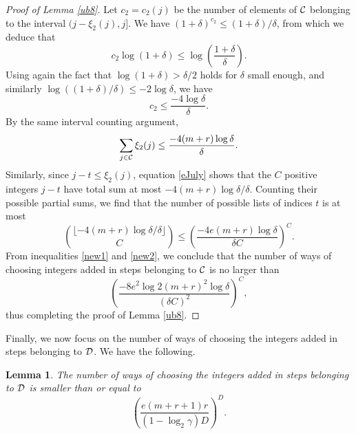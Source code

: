 \documentclass{article}
\newtheorem{lemma}[theorem]{Lemma}
\theoremstyle{definition}
\begin{document}
\begin{proof}[Proof of Lemma \ref{ub8}]
Let $c_2=c_2(j)$ be the number of elements of ${\cal C}$ belonging to the interval ${(j-\xi_2(j),j]}$. We have $(1+\delta)^{c_2}\le (1+\delta)/\delta$, from which we deduce that
$$
c_2\log(1+\delta) \le \log \left(\frac{1+\delta}{\delta}\right).
$$
Using again the fact that $\log(1+\delta)>\delta/2$ holds for $\delta$ small enough, and similarly $\log((1+\delta)/\delta)\le-2\log\delta$, we have
$$
c_2\le \frac{-4\log \delta}{\delta}.
$$
By the same interval counting argument,
\begin{equation}\label{eJuly}
\sum_{j\in {\cal C}} \xi_2(j)\le \frac{-4 (m+r)\log \delta}{\delta}.
\end{equation}
Similarly, since $j-t\le\xi_2(j)$, equation \eqref{eJuly}
shows that the $C$ positive integers $j-t$ have total sum
at most $-4(m+r)\log\delta/\delta$.
Counting their possible partial sums, we find that the
number of possible lists of indices $t$ is at most
\begin{equation}\label{new2}
\binom{\lfloor-4(m+r)\log\delta/\delta\rfloor}{C}
\le
\left(\frac{-4e(m+r)\log\delta}{\delta C}\right)^C.
\end{equation}
From inequalities \eqref{new1} and \eqref{new2}, we conclude that the number of ways of choosing integers added in steps belonging to ${\cal C}$ is no larger than
$$
\left(\frac{-8e^2\log 2(m+r)^2\log \delta}{(\delta C)^2}\right)^{C},
$$
thus completing the proof of Lemma \ref{ub8}.
\end{proof}

Finally, we now focus on the number of ways of choosing the integers added in steps belonging to ${\cal D}$. We have the following.
\begin{lemma}\label{ub9}
The number of ways of choosing the integers added in steps belonging to ${\cal D}$ is smaller than or equal to
$$
\left(\frac{e(m+r+1)r}{(1-\log_2 \gamma)D}\right)^D.
$$
\end{lemma}
\end{document}
